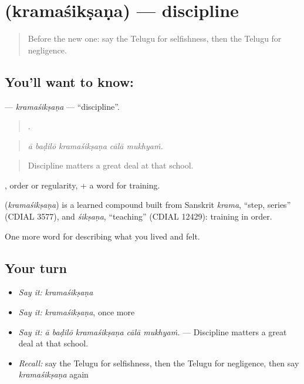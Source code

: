 \section[\texorpdfstring{\te{క్రమశిక్షణ} (kramaśikṣaṇa)}{క్రమశిక్షణ (kramaśikṣaṇa)}]{ (kramaśikṣaṇa) — discipline}

\label{lesson:TE-C510-kramasiksana}



\begin{quote}
Before the new one: say the Telugu for selfishness, then the Telugu for negligence.
\end{quote}

\subsection*{You'll want to know: }
\textbf{} — \emph{kramaśikṣaṇa} — \textquotedblleft{}discipline\textquotedblright{}.

\begin{quote}
    .
\end{quote}

\begin{quote}
\emph{ā baḍilō kramaśikṣaṇa cālā mukhyaṁ.}
\end{quote}

\begin{quote}
Discipline matters a great deal at that school.
\end{quote}

, order or regularity, + a word for training.

\begin{cousinweb}
\textbf{} (\emph{kramaśikṣaṇa}) is a learned compound built from Sanskrit \emph{krama}, \textquotedblleft{}step, series\textquotedblright{} (CDIAL 3577), and \emph{śikṣaṇa}, \textquotedblleft{}teaching\textquotedblright{} (CDIAL 12429): training in order.
\end{cousinweb}

\begin{grammarlens}[title={What you've built}]
One more word for describing what you lived and felt.
\end{grammarlens}

\subsection*{Your turn}
\begin{itemize}
\raggedright
  \item \emph{Say it:} \emph{kramaśikṣaṇa}
  \item \emph{Say it:} \emph{kramaśikṣaṇa}, once more
  \item \emph{Say it:} \emph{ā baḍilō kramaśikṣaṇa cālā mukhyaṁ.} — Discipline matters a great deal at that school.
  \item \emph{Recall:} say the Telugu for selfishness, then the Telugu for negligence, then say \emph{kramaśikṣaṇa} again
\end{itemize}

